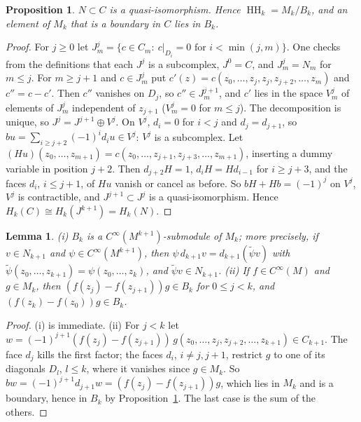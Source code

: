\documentclass[11pt,oneside,reqno]{article}
\DeclareMathOperator{\HH}{HH}
\newcommand{\CI}{C^\infty}
\theoremstyle{plain}
\newtheorem{proposition}[theorem]{Proposition}
\newtheorem{lemma}[theorem]{Lemma}
\theoremstyle{definition}
\theoremstyle{remark}
\begin{document}
\begin{proposition}\label{prop:normalized}
\(N\subset C\) is a quasi-isomorphism. Hence \(\HH_k=M_k/B_k\), and an element of \(M_k\) that
is a boundary in \(C\) lies in \(B_k\).
\end{proposition}

\begin{proof}
For \(j\ge0\) let \(J^j_m=\{c\in C_m:\ c|_{D_i}=0\text{ for }i<\min(j,m)\}\). One checks from the
definitions that each \(J^j\) is a subcomplex, \(J^0=C\), and \(J^j_m=N_m\) for \(m\le j\). For
\(m\ge j+1\) and \(c\in J^j_m\) put \(c'(z)=c(z_0,\dots,z_j,z_j,z_{j+2},\dots,z_m)\) and \(c''=c-c'\). Then
\(c''\) vanishes on \(D_j\), so \(c''\in J^{j+1}_m\), and \(c'\) lies in the space \(V^j_m\) of elements of
\(J^j_m\) independent of \(z_{j+1}\) (\(V^j_m=0\) for \(m\le j\)). The decomposition is unique, so
\(J^j=J^{j+1}\oplus V^j\). On \(V^j\), \(d_i=0\) for \(i<j\) and \(d_j=d_{j+1}\), so
\(bu=\sum_{i\ge j+2}(-1)^id_iu\in V^j\): \(V^j\) is a subcomplex. Let
\((Hu)(z_0,\dots,z_{m+1})=c(z_0,\dots,z_{j+1},z_{j+3},\dots,z_{m+1})\), inserting a dummy variable in
position \(j+2\). Then \(d_{j+2}H=1\), \(d_iH=Hd_{i-1}\) for \(i\ge j+3\), and the faces \(d_i\), \(i\le j+1\),
of \(Hu\) vanish or cancel as before. So \(bH+Hb=(-1)^j\) on \(V^j\), \(V^j\) is contractible, and
\(J^{j+1}\subset J^j\) is a quasi-isomorphism. Hence \(H_k(C)\cong H_k(J^{k+1})=H_k(N)\).
\end{proof}

\begin{lemma}\label{lem:Bmodule}
\textup{(i)} \(B_k\) is a \(\CI(M^{k+1})\)-submodule of \(M_k\); more precisely, if \(v\in N_{k+1}\) and
\(\psi\in\CI(M^{k+1})\), then \(\psi\,d_{k+1}v=d_{k+1}(\tilde\psi v)\) with
\(\tilde\psi(z_0,\dots,z_{k+1})=\psi(z_0,\dots,z_k)\), and \(\tilde\psi v\in N_{k+1}\).
\textup{(ii)} If \(f\in\CI(M)\) and \(g\in M_k\), then \((f(z_j)-f(z_{j+1}))g\in B_k\) for \(0\le j<k\), and
\((f(z_k)-f(z_0))g\in B_k\).
\end{lemma}

\begin{proof}
(i) is immediate. (ii) For \(j<k\) let
\(w=(-1)^{j+1}(f(z_j)-f(z_{j+1}))\,g(z_0,\dots,z_j,z_{j+2},\dots,z_{k+1})\in C_{k+1}\). The face
\(d_j\) kills the first factor; the faces \(d_i\), \(i\ne j,j+1\), restrict \(g\) to one of its
diagonals \(D_l\), \(l\le k\), where it vanishes since \(g\in M_k\). So
\(bw=(-1)^{j+1}d_{j+1}w=(f(z_j)-f(z_{j+1}))g\), which lies in \(M_k\) and is a boundary, hence in
\(B_k\) by Proposition~\ref{prop:normalized}. The last case is the sum of the others.
\end{proof}
\end{document}
